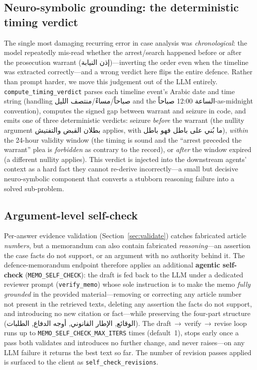 \documentclass[final,1p,times]{elsarticle}
\newcommand{\ar}[1]{{\arabicfont\beginR #1\endR}}
\begin{document}
\subsection{Neuro-symbolic grounding: the deterministic timing verdict}\label{sec:timing}

The single most damaging recurring error in case analysis was \emph{chronological}:
the model repeatedly mis-read whether the arrest/search happened before or after
the prosecution warrant (\ar{إذن النيابة})---inverting the order even when the
timeline was extracted correctly---and a wrong verdict here flips the entire
defence. Rather than prompt harder, we move this judgement out of the LLM
entirely. \texttt{compute\_timing\_verdict} parses each timeline event's Arabic
date and time string (handling \ar{صباحاً}/\ar{مساءً}/\ar{منتصف الليل} and the
\ar{الساعة 12:00 صباحاً}-as-midnight convention), computes the signed gap between
warrant and seizure in code, and emits one of three deterministic verdicts: seizure
\emph{before} the warrant (the nullity argument \ar{بطلان القبض والتفتيش} applies,
with \ar{ما بُني على باطل فهو باطل}), \emph{within} the 24-hour validity window (the
timing is sound and the ``arrest preceded the warrant'' plea is \emph{forbidden} as
contrary to the record), or \emph{after} the window expired (a different nullity
applies). This verdict is injected into the downstream agents' context as a hard
fact they cannot re-derive incorrectly---a small but decisive neuro-symbolic
component that converts a stubborn reasoning failure into a solved sub-problem.

\subsection{Argument-level self-check}\label{sec:selfcheck}

Per-answer evidence validation (Section~\ref{sec:validate}) catches fabricated
article \emph{numbers}, but a memorandum can also contain fabricated
\emph{reasoning}---an assertion the case facts do not support, or an argument with
no authority behind it. The defence-memorandum endpoint therefore applies an
additional \textbf{agentic self-check} (\texttt{MEMO\_SELF\_CHECK}): the draft is
fed back to the LLM under a dedicated reviewer prompt (\texttt{verify\_memo}) whose
sole instruction is to make the memo \emph{fully grounded} in the provided
material---removing or correcting any article number not present in the retrieved
texts, deleting any assertion the facts do not support, and introducing no new
citation or fact---while preserving the four-part structure (\ar{الوقائع},
\ar{الإطار القانوني}, \ar{أوجه الدفاع}, \ar{الطلبات}). The
draft\,$\rightarrow$\,verify\,$\rightarrow$\,revise loop runs up to
\texttt{MEMO\_SELF\_CHECK\_MAX\_ITERS} times (default~1), stops early once a pass
both validates and introduces no further change, and never raises---on any LLM
failure it returns the best text so far. The number of revision passes applied is
surfaced to the client as \texttt{self\_check\_revisions}.
\end{document}
